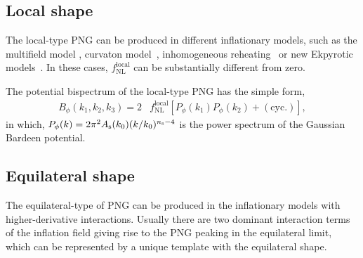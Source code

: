 \documentclass[twocolumn,floatfix,nofootinbib,aps,reprint]{revtex4}
\begin{document}
\subsection{Local shape}
The local-type PNG can be produced in
different inflationary models, such as the multifield model
\cite{1997PhRvD..56..535L,2006JCAP...01..006A}, 
curvaton model~\cite{2003PhRvD..67b3503L},
inhomogeneous reheating~\cite{2004PhRvD..69b3505D} 
or new Ekpyrotic models~\cite{2008PhRvD..77f3533L}.
In these cases, $f_\mathrm{NL}^\mathrm{local}$ can be substantially 
different from zero.

The potential bispectrum of the local-type PNG 
has the simple form,
\begin{equation}
    \begin{split}
        B_\phi(k_1, k_2, k_3) = 2 &f_\mathrm{NL}^\mathrm{local} 
        \left[ P_\phi(k_1)P_\phi(k_2) + (\mathrm{cyc.})\right], \label{eq:B-local}
    \end{split}
\end{equation}
in which, 
$P_\phi(k)=2\pi^2 A_{\rm s}(k_0) (k/k_0)^{n_{\rm s}-4}$
is the power spectrum of the Gaussian Bardeen potential. 

\subsection{Equilateral shape}
The equilateral-type of PNG can be produced in the inflationary
models with higher-derivative interactions. 
Usually there are two dominant interaction terms of the inflation
field giving rise to the PNG peaking in the equilateral limit, which 
can be represented by a unique template with the equilateral shape.
\end{document}

